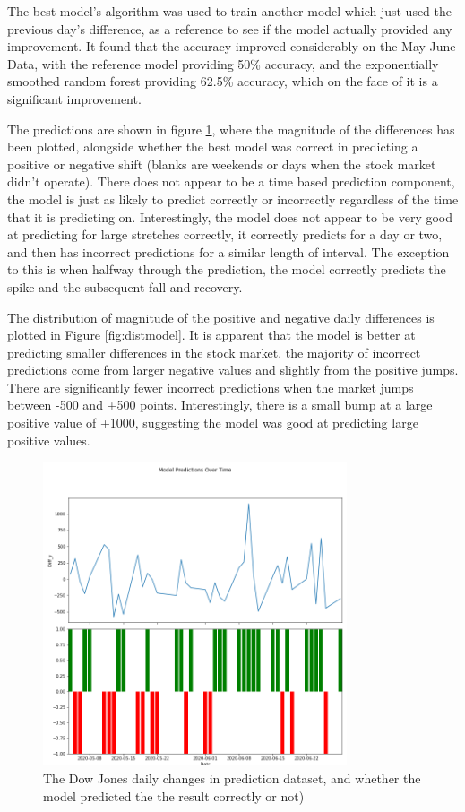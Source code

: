 The best model's algorithm was used to train another model which just used the previous day's difference, as a reference to see if the model actually provided any improvement. It found that the accuracy improved considerably on the May June Data, with the reference model providing 50\% accuracy, and the exponentially smoothed random forest providing 62.5\% accuracy, which on the face of it is a significant improvement. 

The predictions are shown in figure \ref{fig:modelpred}, where the magnitude of the differences has been plotted, alongside whether the best model was correct in predicting a positive or negative shift (blanks are weekends or days when the stock market didn't operate). There does not appear to be a time based prediction component, the model is just as likely to predict correctly or incorrectly regardless of the time that it is predicting on. Interestingly, the model does not appear to be very good at predicting for large stretches correctly, it correctly predicts for a day or two, and then has incorrect predictions for a similar length of interval. The exception to this is when halfway through the prediction, the model correctly predicts the spike and the subsequent fall and recovery. 

The distribution of magnitude of the positive and negative daily differences is plotted in Figure \ref{fig:distmodel}.  It is apparent that the model is better at predicting smaller differences in the stock market. the majority of incorrect predictions come from larger negative values and slightly from the positive jumps. There are significantly fewer incorrect predictions when the market jumps between -500 and +500 points. Interestingly, there is a small bump at a large positive value of +1000, suggesting the model was good at predicting large positive values. 

\begin{figure}[H]
	\centering
	\includegraphics[width=0.8\textwidth]{images/model_pred_time.png}
	\caption{The Dow Jones daily changes in prediction dataset, and whether the model predicted the the result correctly or not)}
	\label{fig:modelpred}
\end{figure}


